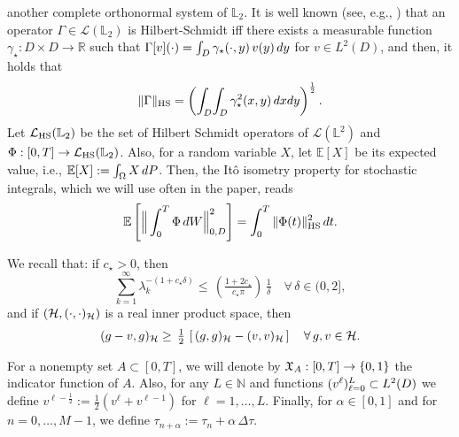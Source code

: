 \documentclass[10pt]{amsart}
\numberwithin{equation}{section}
\begin{document}
another complete orthonormal system of ${\mathbb L}_2$.
It is well known (see, e.g., \cite{DunSch}) that an operator
$\Gamma\in{\mathcal L}({\mathbb L}_2)$ is Hilbert-Schmidt iff
there exists a measurable function $\gamma_{\star}:D\times D\rightarrow{\mathbb
R}$ such that $\Gamma[v](\cdot)=\int_{{\scriptscriptstyle} D}\gamma_{\star}(\cdot,y)\,v(y)\,dy$
for $v\in L^2(D)$, and then, it holds that
\begin{equation}\label{HSxar}
\|\Gamma\|_{{\scriptscriptstyle}\rm HS} =\left(\int_{{\scriptscriptstyle} D}\!\int_{{\scriptscriptstyle}
D}\gamma_{\star}^2(x,y)\,dxdy\right)^{\frac{1}{2}}.
\end{equation}
Let ${\mathcal L}_{{\scriptscriptstyle}\rm HS}({\mathbb L}_2)$ be the set of
Hilbert Schmidt operators of ${\mathcal L}({\mathbb L}^2)$ and
$\Phi:[0,T]\rightarrow {\mathcal L}_{{\scriptscriptstyle}\rm HS}({\mathbb L}_2)$.
Also, for a random variable $X$, let ${\mathbb E}[X]$ be its
expected value, i.e., ${\mathbb E}[X]:=\int_{{\scriptscriptstyle}\Omega}X\,dP$.
Then, the It{\^o} isometry property for stochastic integrals,
which we will use often in the paper, reads
\begin{equation}\label{Ito_Isom}
{\mathbb E}\left[\Big\|\int_0^{{\scriptscriptstyle} T}\Phi\,dW\Big\|_{{\scriptscriptstyle} 0,D}^2\right]
=\int_0^{{\scriptscriptstyle} T}\|\Phi(t)\|_{{\scriptscriptstyle}\rm HS}^2\,dt.
\end{equation}
\par
We recall that: if $c_{\star}>0$, then
\begin{equation}\label{SR_BOUND}
\sum_{k=1}^{\infty}\lambda_k^{-(1+c_{\star}\delta)}
\leq\,\left(\tfrac{1+2c_{\star}}{c_{\star}\pi}\right)\,\tfrac{1}{\delta}
\quad\forall\,\delta\in(0,2],
\end{equation}
and if $({\mathcal H},(\cdot,\cdot)_{{\scriptscriptstyle}{\mathcal H}})$ is a
real inner product space, then
\begin{equation}\label{innerproduct}
(g-v,g)_{{\scriptscriptstyle}{\mathcal H}}
\ge\,\tfrac{1}{2}\,\left[\,(g,g)_{{\scriptscriptstyle}{\mathcal H}}
-(v,v)_{{\scriptscriptstyle}{\mathcal H}}\,\right]\quad\forall\,g,v\in{\mathcal H}.
\end{equation}
\par
For a nonempty set $A\subset[0,T]$, we will denote by ${\mathfrak X}_{{\scriptscriptstyle} A}:[0,T]\rightarrow\{0,1\}$
the indicator function of $A$. Also, for any $L\in{\mathbb N}$ and 
functions $(v^{\ell})_{\ell=0}^{{\scriptscriptstyle} L}\subset L^2(D)$ we define
$v^{\ell-{\frac{1}{2}}}:=\tfrac{1}{2}(v^{\ell}+v^{\ell-1})$
for $\ell=1,\dots,L$. Finally, for $\alpha\in[0,1]$ and for $n=0,\dots,M-1$, 
we define $\tau_{n+\alpha}:=\tau_n+\alpha\,{\Delta\tau}$. 
\end{document}
